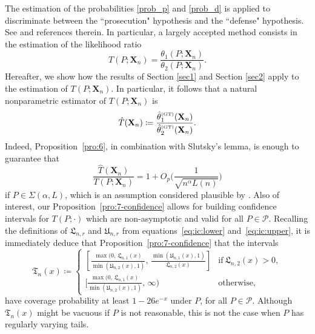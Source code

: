 \documentclass{article}
\newcommand{\1}{\boldsymbol{1}}
\theoremstyle{plain}
\begin{document}
The estimation of the probabilities \eqref{prob_p} and \eqref{prob_d} is applied to discriminate between the ``prosecution" hypothesis and the ``defense" hypothesis. See \cite{Bre(10),Cer(17),Cer(20)} and references therein. In particular, a largely accepted method consists in the estimation of the likelihood ratio
\begin{displaymath}
T(P;\mathbf{X}_{n})=\frac{\theta_1(P;\mathbf{X}_{n})}{\theta_{2}(P;\mathbf{X}_{n})}.
\end{displaymath}
Hereafter, we show how the results of Section \ref{sec1} and Section \ref{sec2} apply to the estimation of $T(P;\mathbf{X}_{n})$. In particular, it follows that a natural nonparametric estimator of $T(P;\mathbf{X}_{n})$ is
\begin{equation*}
  \hat{T}(\mathbf{X}_n)%
  \coloneqq \frac{\hat{\theta}_1^{\text{\tiny{(GT)}}}(\mathbf{X}_n)}{\hat{\theta}^{\text{\tiny{(GT)}}}_2(\mathbf{X}_n)}.
\end{equation*}
Indeed, Proposition~\ref{pro:6}, in combination with Slutsky's lemma, is enough to guarantee that
\begin{equation*}
  \frac{\hat{T}(\mathbf{X}_n)}{T(P;\mathbf{X}_n)} = 1 + O_p\Big(\frac{1}{\sqrt{n^{\alpha}L(n)}}\Big)
\end{equation*}
if $P \in \Sigma(\alpha,L)$, which is an assumption considered plausible by \cite{Cer(17),Cer(20)}. Also of interest, our Proposition~\ref{pro:7-confidence} allows for building confidence intervals for $T(P;\cdot)$ which are non-asymptotic and valid for all $P \in \mathcal{P}$. Recalling the definitions of $\mathfrak{L}_{n,r}$ and $\mathfrak{U}_{n,r}$ from equations~\eqref{eq:ic:lower} and~\eqref{eq:ic:upper}, it is immediately deduce that Proposition~\ref{pro:7-confidence} that the intervals
\begin{equation*}
  \mathfrak{T}_n(x) \coloneqq%
  \begin{cases}
    [\frac{\max(0,\, \mathfrak{L}_{n,1}(x)}{\min(\mathfrak{U}_{n,2}(x),1)},\, \frac{\min(\mathfrak{U}_{n,1}(x),1)}{\mathfrak{L}_{n,2}(x)}] &\mathrm{if}\ \mathfrak{L}_{n,2}(x) > 0,\\[0.4cm]
    [\frac{\max(0,\, \mathfrak{L}_{n,1}(x)}{\min(\mathfrak{U}_{n,2}(x),1)},\, \infty) &\mathrm{otherwise},
  \end{cases}
\end{equation*}
have coverage probability at least $1 - 26e^{-x}$ under $P$, for all $P\in \mathcal{P}$. Although $\mathfrak{T}_n(x)$ might be vacuous if $P$ is not reasonable, this is not the case when $P$ has regularly varying tails. 
\end{document}
